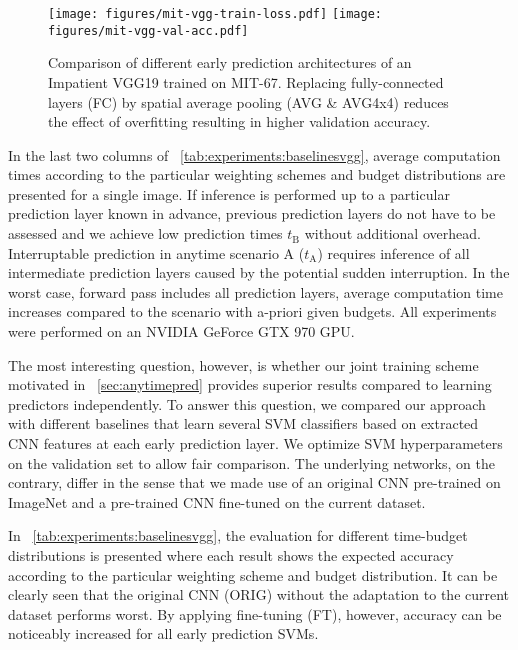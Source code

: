 \documentclass{bmvc2k}
\begin{document}
    \begin{figure}[t]
        \centering
        \texttt{[image: figures/mit-vgg-train-loss.pdf]}
        \texttt{[image: figures/mit-vgg-val-acc.pdf]}
        \caption{Comparison of different early prediction architectures of an Impatient VGG19 trained on MIT-67.
            Replacing fully-connected layers (FC) by spatial average pooling (AVG \& AVG4x4) reduces the effect of overfitting resulting in higher validation accuracy.
        }
        \label{fig:experiments:EPs}
    \end{figure}


    In the last two columns of \tablename~\ref{tab:experiments:baselinesvgg}, average computation times according to the particular weighting schemes and budget distributions are presented for a single image.
    If inference is performed up to a particular prediction layer known in advance, previous prediction layers do not have to be assessed
    and we achieve low prediction times $t_{\text{B}}$ without additional overhead.
    Interruptable prediction in anytime scenario A ($t_{\text{A}}$) requires inference of all intermediate prediction layers caused by the potential sudden interruption.
    In the worst case, \ie\the forward pass includes all prediction layers, average computation time increases compared to the
    scenario with a-priori given budgets.
    All experiments were performed on an NVIDIA GeForce GTX 970 GPU.

    The most interesting question, however, is whether our joint training scheme motivated in \sectionname~\ref{sec:anytimepred}
    provides superior results compared to learning predictors independently.
    To answer this question, we compared our approach with different baselines that learn several SVM classifiers based on extracted CNN features \cite{donahue2013decaf} at each early prediction layer.
    We optimize SVM hyperparameters on the validation set to allow fair comparison.
    The underlying networks, on the contrary, differ in the sense that we made use of an original CNN pre-trained on ImageNet and a pre-trained CNN fine-tuned on the current dataset.

    In \tablename~\ref{tab:experiments:baselinesvgg}, the evaluation for different time-budget distributions is presented where each result shows the expected
    accuracy according to the particular weighting scheme and budget distribution.
    It can be clearly seen that the original CNN (ORIG) without the adaptation to the current dataset performs worst.
    By applying fine-tuning (FT), however, accuracy can be noticeably increased for all early prediction SVMs.
\end{document}
